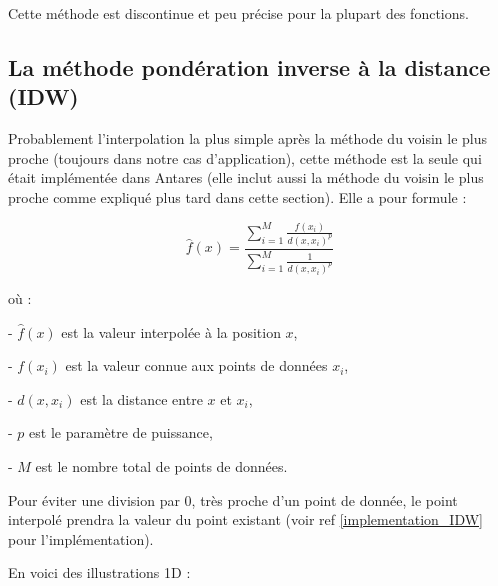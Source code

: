 Cette méthode est discontinue et peu précise pour la plupart des fonctions.



\subsection{La méthode pondération inverse à la distance (IDW)} %

Probablement l'interpolation la plus simple après la méthode du voisin le plus proche (toujours dans notre cas d'application), cette méthode est la seule qui était implémentée dans Antares (elle inclut aussi la méthode du voisin le plus proche comme expliqué plus tard dans cette section). Elle a pour formule :

\[
\hat{f}(x) = \frac{\sum_{i=1}^{M} \frac{f(x_i)}{d(x, x_i)^p}}{\sum_{i=1}^{M} \frac{1}{d(x, x_i)^p}}
\]

où :

- \(\hat{f}(x)\) est la valeur interpolée à la position \(x\),

- \(f(x_i)\) est la valeur connue aux points de données \(x_i\),

- \(d(x, x_i)\) est la distance entre \(x\) et \(x_i\),

- \(p\) est le paramètre de puissance,

- \(M\) est le nombre total de points de données.

\vspace*{0,5cm}

Pour éviter une division par 0, très proche d'un point de donnée, le point interpolé prendra la valeur du point existant (voir ref \ref{implementation_IDW} pour l'implémentation).

\vspace*{0,5cm}


En voici des illustrations 1D :

